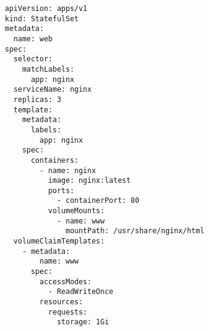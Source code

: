 \begin{verbatim}
apiVersion: apps/v1
kind: StatefulSet
metadata:
  name: web
spec:
  selector:
    matchLabels:
      app: nginx
  serviceName: nginx
  replicas: 3
  template:
    metadata:
      labels:
        app: nginx
    spec:
      containers:
        - name: nginx
          image: nginx:latest
          ports:
            - containerPort: 80
          volumeMounts:
            - name: www
              mountPath: /usr/share/nginx/html
  volumeClaimTemplates:
    - metadata:
        name: www
      spec:
        accessModes:
          - ReadWriteOnce
        resources:
          requests:
            storage: 1Gi
\end{verbatim}